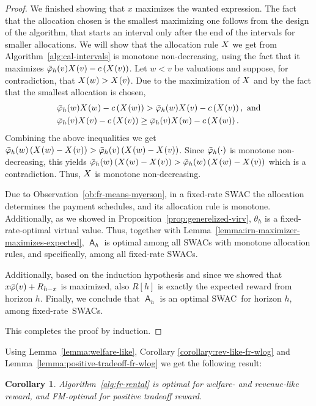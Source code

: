 \documentclass[11pt,letterpaper]{article}
\newcommand{\brackets}[1]{\left( #1 \right)}
\newcommand{\fr}{fixed-rate\xspace}
\newcommand{\swac}{SWAC\xspace}
\newcommand{\swacs}{SWACs\xspace}
\DeclareMathOperator{\A}{\auc{A}}
\newcommand{\irn}{\Bar{\varphi}}
\theoremstyle{plain}
\newtheorem{corollary}[theorem]{Corollary}
\newcommand{\auc}[1]{\mathsf{#1}}
\begin{document}
\begin{proof}
    We finished showing that $x$ maximizes the wanted expression. The fact that the allocation chosen is the smallest maximizing one follows from the design of the algorithm, that 
    starts an interval only after the end of the intervals for smaller allocations.
    We will show that the allocation rule $\alloc$ we get from Algorithm~\ref{alg:cal-intervals} is monotone non-decreasing, using the fact that it maximizes $\irn_h(v)\x{v}-c\brackets{\x{v}}$. Let $w<v$ be valuations and suppose, for contradiction, that $\x{w}>\x{v}$. Due to the maximization of $\alloc$ and by the fact that the smallest allocation is chosen,
    \begin{align*}
    &\irn_h(w)\x{w}-c\brackets{\x{w}}>\irn_h(w)\x{v}-c\brackets{\x{v}},\textnormal{ and}\\
        &\irn_h(v)\x{v}-c\brackets{\x{v}}\geq\irn_h(v)\x{w}-c\brackets{\x{w}}.
    \end{align*}
    Combining the above inequalities we get $\irn_h(w)\brackets{\x{w}-\x{v}}>\irn_h(v)\brackets{\x{w}-\x{v}}$. Since $\irn_h(\cdot)$ is monotone non-decreasing, this yields $\irn_h(w)\brackets{\x{w}-\x{v}}>\irn_h(w)\brackets{\x{w}-\x{v}}$ which is a contradiction. Thus, $\alloc$ is monotone non-decreasing.   

    Due to Observation~\ref{ob:fr-means-myerson}, in a \fr \swac the allocation determines the payment schedules, and its allocation rule is monotone. Additionally, as we showed in Proposition~\ref{prop:generelized-virv}, $\theta_h$ is a \fr-optimal virtual value.
    Thus, together with Lemma~\ref{lemma:irn-maximizer-maximizes-expected}, $\A_h$ is optimal among all \swacs with monotone allocation rules, and specifically, among all \fr \swacs.
    
    Additionally, based on the induction hypothesis and since we showed that $x\irn(v)+R_{h-x}$ is maximized, also $R[h]$ is exactly the expected reward from horizon $h$. Finally, we conclude that $\A_h$ is an optimal \swac\ for horizon $h$, among \fr\ \swacs. 
    
     This completes the proof by induction.
\end{proof}

Using Lemma~\ref{lemma:welfare-like}, Corollary \ref{corollary:rev-like-fr-wlog} and Lemma~\ref{lemma:positive-tradeoff-fr-wlog} we get the following result:
\begin{corollary}
    Algorithm~\ref{alg:fr-rental} is optimal for welfare- and revenue-like reward, and FM-optimal for positive tradeoff reward.
\end{corollary}
\end{document}
